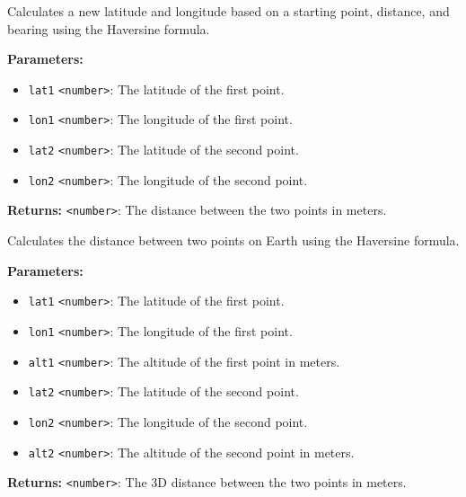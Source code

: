 \documentclass[12pt,a4paper]{article}
\begin{document}
\noindent Calculates a new latitude and longitude based on a starting point, distance, and bearing using the Haversine formula.

\vspace{5mm}
\noindent {}


\noindent \textbf{Parameters:}
\begin{itemize}
  \item \texttt{lat1} \texttt{<number>}: The latitude of the first point.
  \item \texttt{lon1} \texttt{<number>}: The longitude of the first point.
  \item \texttt{lat2} \texttt{<number>}: The latitude of the second point.
  \item \texttt{lon2} \texttt{<number>}: The longitude of the second point.
\end{itemize}

\noindent \textbf{Returns:} \texttt{<number>}: The distance between the two points in meters.

\noindent Calculates the distance between two points on Earth using the Haversine formula.

\vspace{5mm}
\noindent {}


\noindent \textbf{Parameters:}
\begin{itemize}
  \item \texttt{lat1} \texttt{<number>}: The latitude of the first point.
  \item \texttt{lon1} \texttt{<number>}: The longitude of the first point.
  \item \texttt{alt1} \texttt{<number>}: The altitude of the first point in meters.
  \item \texttt{lat2} \texttt{<number>}: The latitude of the second point.
  \item \texttt{lon2} \texttt{<number>}: The longitude of the second point.
  \item \texttt{alt2} \texttt{<number>}: The altitude of the second point in meters.
\end{itemize}

\noindent \textbf{Returns:} \texttt{<number>}: The 3D distance between the two points in meters.
\end{document}
